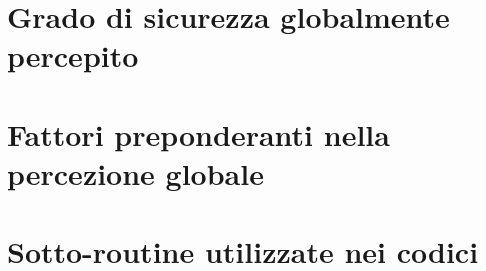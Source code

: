 \section{Grado di sicurezza globalmente percepito}
\label{code:safety}


\section{Fattori preponderanti nella percezione globale}
\label{code:satisfaction}


\newpage

\section{Sotto-routine utilizzate nei codici}
\label{code:subroutines}


